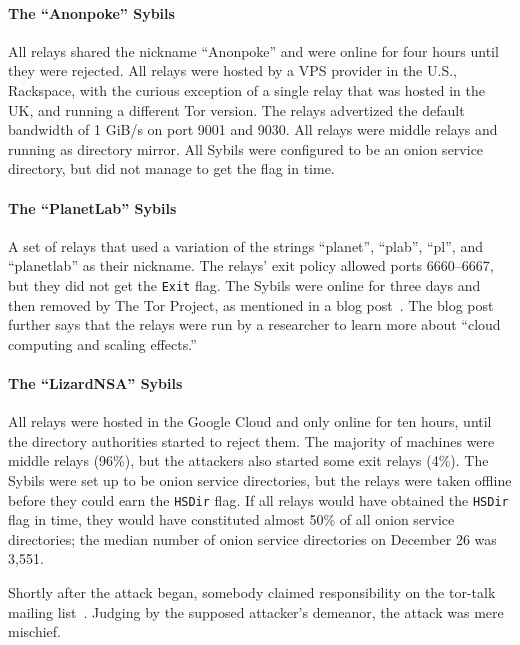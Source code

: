 \paragraph{The ``Anonpoke'' Sybils}
All relays shared the nickname ``Anonpoke'' and were online for four hours until
they were rejected.  All relays were hosted by a VPS provider in the U.S.,
Rackspace, with the curious exception of a single relay that was hosted in the
UK, and running a different Tor version.  The relays advertized the default
bandwidth of 1 GiB/s on port 9001 and 9030.  All relays were middle relays and
running as directory mirror.  All Sybils were configured to be an onion service
directory, but did not manage to get the flag in time.

\paragraph{The ``PlanetLab'' Sybils}
A set of relays that used a variation of the strings ``planet'', ``plab'',
``pl'', and ``planetlab'' as their nickname.  The relays' exit policy allowed
ports 6660--6667, but they did not get the \texttt{Exit} flag.  The Sybils were
online for three days and then removed by The Tor Project, as mentioned in a
blog post~\cite{progressreport}.  The blog post further says that the relays
were run by a researcher to learn more about ``cloud computing and scaling
effects.''

\paragraph{The ``LizardNSA'' Sybils}
All relays were hosted in the Google Cloud and only online for ten hours, until
the directory authorities started to reject them.  The majority of machines were
middle relays (96\%), but the attackers also started some exit relays (4\%).
The Sybils were set up to be onion service directories, but the relays were
taken offline before they could earn the \texttt{HSDir} flag.  If all relays
would have obtained the \texttt{HSDir} flag in time, they would have constituted
almost 50\% of all onion service directories; the median number of onion
service directories on December 26 was 3,551.

Shortly after the attack began, somebody claimed responsibility on the tor-talk
mailing list~\cite{lizards}.  Judging by the supposed attacker's demeanor, the
attack was mere mischief.

